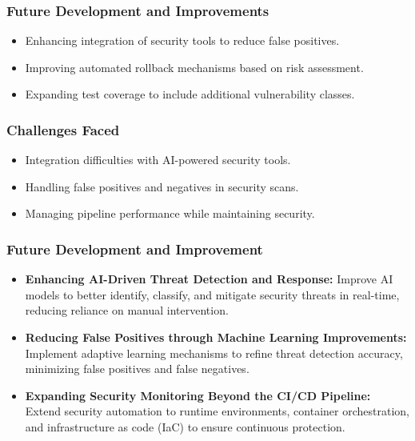 \documentclass[conference]{IEEEtran}
\begin{document}
\subsubsection{Future Development and Improvements}
\begin{itemize}
    \item Enhancing integration of security tools to reduce false positives.
    \item Improving automated rollback mechanisms based on risk assessment.
    \item Expanding test coverage to include additional vulnerability classes.
\end{itemize}


\subsubsection{Challenges Faced}
\begin{itemize}
    \item Integration difficulties with AI-powered security tools.
    \item Handling false positives and negatives in security scans.
    \item Managing pipeline performance while maintaining security.
\end{itemize}

\subsubsection{Future Development and Improvement}
\begin{itemize}
    \item \textbf{Enhancing AI-Driven Threat Detection and Response:}  
    Improve AI models to better identify, classify, and mitigate security threats in real-time, reducing reliance on manual intervention.
    
    \item \textbf{Reducing False Positives through Machine Learning Improvements:}  
    Implement adaptive learning mechanisms to refine threat detection accuracy, minimizing false positives and false negatives.
    
    \item \textbf{Expanding Security Monitoring Beyond the CI/CD Pipeline:}  
    Extend security automation to runtime environments, container orchestration, and infrastructure as code (IaC) to ensure continuous protection.
\end{itemize}
\end{document}
